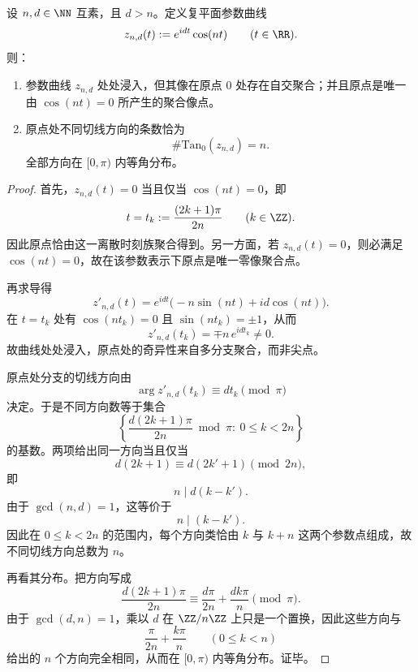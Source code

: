\begin{proposition}[有理玫瑰在原点的唯一聚合奇异性与切锥方向数]\label{prop:xi-time-part62da-rational-rose-origin-tangent-cone}
设 \(n,d\in\NN\) 互素，且 \(d>n\)。定义复平面参数曲线
\[
z_{n,d}(t):=e^{idt}\cos(nt)
\qquad (t\in\RR).
\]
则：
\begin{enumerate}
  \item 参数曲线 \(z_{n,d}\) 处处浸入，但其像在原点 \(0\) 处存在自交聚合；并且原点是唯一由 \(\cos(nt)=0\) 所产生的聚合像点。
  \item 原点处不同切线方向的条数恰为
  \[
  \boxed{\;
  \#\mathrm{Tan}_0(z_{n,d})
  =
  n.\;}
  \]
  全部方向在 \([0,\pi)\) 内等角分布。
\end{enumerate}
\end{proposition}
\begin{proof}
首先，\(z_{n,d}(t)=0\) 当且仅当 \(\cos(nt)=0\)，即
\[
t=t_k:=\frac{(2k+1)\pi}{2n}
\qquad (k\in\ZZ).
\]
因此原点恰由这一离散时刻族聚合得到。另一方面，若 \(z_{n,d}(t)=0\)，则必满足 \(\cos(nt)=0\)，故在该参数表示下原点是唯一零像聚合点。

再求导得
\[
z'_{n,d}(t)
=
e^{idt}\bigl(-n\sin(nt)+id\cos(nt)\bigr).
\]
在 \(t=t_k\) 处有 \(\cos(nt_k)=0\) 且 \(\sin(nt_k)=\pm 1\)，从而
\[
z'_{n,d}(t_k)=\mp n\,e^{idt_k}\neq 0.
\]
故曲线处处浸入，原点处的奇异性来自多分支聚合，而非尖点。

原点处分支的切线方向由
\[
\arg z'_{n,d}(t_k)\equiv dt_k\pmod\pi
\]
决定。于是不同方向数等于集合
\[
\left\{\frac{d(2k+1)\pi}{2n}\bmod \pi:\ 0\le k<2n\right\}
\]
的基数。两项给出同一方向当且仅当
\[
d(2k+1)\equiv d(2k'+1)\pmod{2n},
\]
即
\[
n\mid d(k-k').
\]
由于 \(\gcd(n,d)=1\)，这等价于
\[
n\mid (k-k').
\]
因此在 \(0\le k<2n\) 的范围内，每个方向类恰由 \(k\) 与 \(k+n\) 这两个参数点组成，故不同切线方向总数为 \(n\)。

再看其分布。把方向写成
\[
\frac{d(2k+1)\pi}{2n}
\equiv
\frac{d\pi}{2n}+\frac{dk\pi}{n}
\pmod\pi.
\]
由于 \(\gcd(d,n)=1\)，乘以 \(d\) 在 \(\ZZ/n\ZZ\) 上只是一个置换，因此这些方向与
\[
\frac{\pi}{2n}+\frac{k\pi}{n}
\qquad (0\le k<n)
\]
给出的 \(n\) 个方向完全相同，从而在 \([0,\pi)\) 内等角分布。证毕。
\end{proof}

